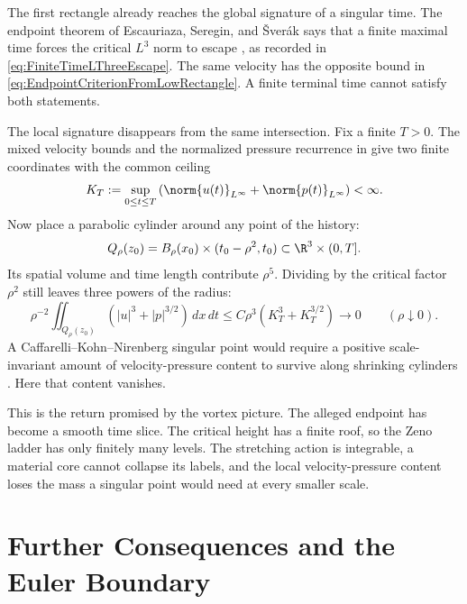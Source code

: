 The first rectangle already reaches the global signature of a singular time.
The endpoint theorem of Escauriaza, Seregin, and \v{S}ver\'ak says that a finite
maximal time forces the critical \(L^3\) norm to escape
\parencite{EscauriazaSereginSverak2003}, as recorded in
\eqref{eq:FiniteTimeLThreeEscape}.  The same velocity has the opposite bound in
\eqref{eq:EndpointCriterionFromLowRectangle}.  A finite terminal time cannot
satisfy both statements.

The local signature disappears from the same intersection.  Fix a finite
\(T>0\).  The mixed velocity bounds and the normalized pressure recurrence in
 give two finite coordinates with the
common ceiling
\begin{equation}\label{eq:FiniteIntervalVelocityPressureSupremum}
  K_T
  :=\sup_{0\leq t\leq T}
  \left(
    \norm{u(t)}_{L^\infty}
    +\norm{p(t)}_{L^\infty}
  \right)
  <\infty.
\end{equation}
Now place a parabolic cylinder around any point of the history:
\[
  Q_\rho(z_0)
  =B_\rho(x_0)\times(t_0-\rho^2,t_0)
  \subset\R^3\times(0,T].
\]
Its spatial volume and time length contribute \(\rho^5\).  Dividing by the
critical factor \(\rho^2\) still leaves three powers of the radius:
\begin{equation}\label{eq:VanishingLocalScaleInvariantContent}
  \rho^{-2}
  \iint_{Q_\rho(z_0)}
  \left(|u|^3+|p|^{3/2}\right)\,dx\,dt
  \leq
  C\rho^3\left(K_T^3+K_T^{3/2}\right)
  \longrightarrow0
  \qquad(\rho\downarrow0).
\end{equation}
A Caffarelli--Kohn--Nirenberg singular point would require a positive
scale-invariant amount of velocity-pressure content to survive along shrinking
cylinders \parencite{CaffarelliKohnNirenberg1982}.  Here that content vanishes.

This is the return promised by the vortex picture.  The alleged endpoint has
become a smooth time slice.  The critical height has a finite roof, so the Zeno
ladder has only finitely many levels.  The stretching action is integrable, a
material core cannot collapse its labels, and the local velocity-pressure
content loses the mass a singular point would need at every smaller scale.

\clearpage
\section{Further Consequences and the Euler Boundary}\label{sec:FurtherConsequencesAndEulerBoundary}

